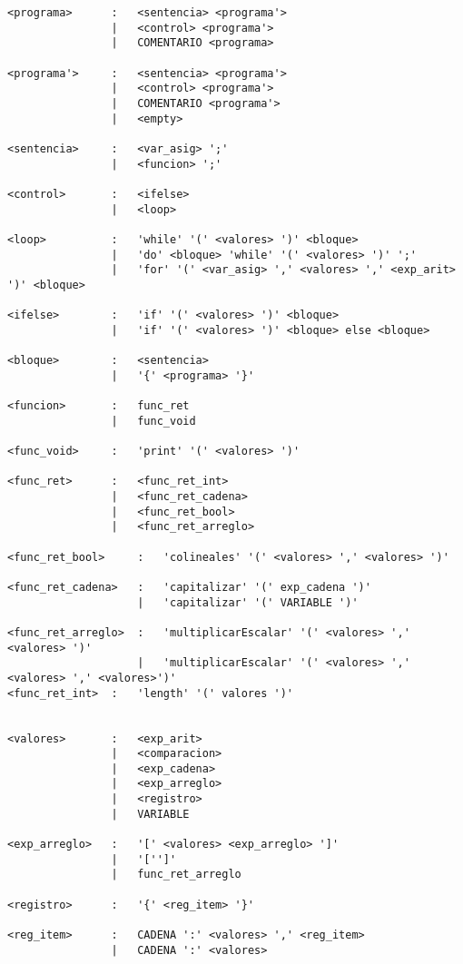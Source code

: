 \begin{verbatim}
<programa>      :   <sentencia> <programa'>   
                |   <control> <programa'>   
                |   COMENTARIO <programa>   

<programa'>     :   <sentencia> <programa'>   
                |   <control> <programa'>   
                |   COMENTARIO <programa'>   
                |   <empty>

<sentencia>     :   <var_asig> ';'
                |   <funcion> ';'

<control>       :   <ifelse>
                |   <loop>

<loop>          :   'while' '(' <valores> ')' <bloque>
                |   'do' <bloque> 'while' '(' <valores> ')' ';' 
                |   'for' '(' <var_asig> ',' <valores> ',' <exp_arit> ')' <bloque>

<ifelse>        :   'if' '(' <valores> ')' <bloque>
                |   'if' '(' <valores> ')' <bloque> else <bloque>

<bloque>        :   <sentencia>
                |   '{' <programa> '}'

<funcion>       :   func_ret
                |   func_void

<func_void>     :   'print' '(' <valores> ')'

<func_ret>      :   <func_ret_int>
                |   <func_ret_cadena>
                |   <func_ret_bool>
                |   <func_ret_arreglo>

<func_ret_bool>     :   'colineales' '(' <valores> ',' <valores> ')'

<func_ret_cadena>   :   'capitalizar' '(' exp_cadena ')'
                    |   'capitalizar' '(' VARIABLE ')'

<func_ret_arreglo>  :   'multiplicarEscalar' '(' <valores> ',' <valores> ')'
                    |   'multiplicarEscalar' '(' <valores> ',' <valores> ',' <valores>')'
<func_ret_int>  :   'length' '(' valores ')'


<valores>       :   <exp_arit>
                |   <comparacion>
                |   <exp_cadena>
                |   <exp_arreglo>
                |   <registro>
                |   VARIABLE

<exp_arreglo>   :   '[' <valores> <exp_arreglo> ']'
                |   '['']'
                |   func_ret_arreglo

<registro>      :   '{' <reg_item> '}'

<reg_item>      :   CADENA ':' <valores> ',' <reg_item>
                |   CADENA ':' <valores> 


\end{verbatim}
